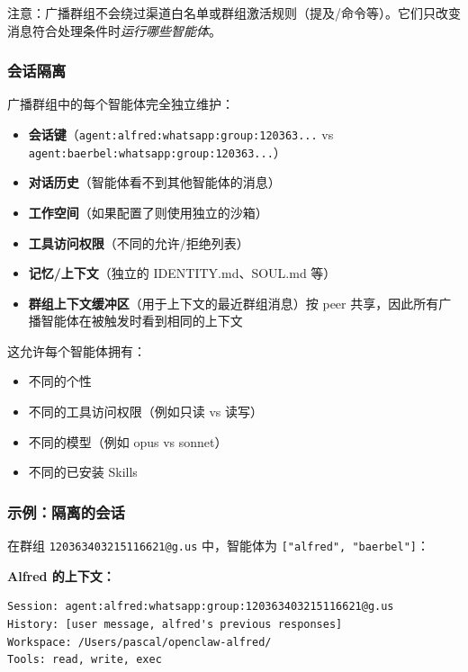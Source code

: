 注意：广播群组不会绕过渠道白名单或群组激活规则（提及/命令等）。它们只改变消息符合处理条件时\textit{运行哪些智能体}。

\subsubsection{会话隔离}


广播群组中的每个智能体完全独立维护：

\begin{itemize}
  \item \textbf{会话键}（\texttt{agent:alfred:whatsapp:group:120363...} vs \texttt{agent:baerbel:whatsapp:group:120363...}）
  \item \textbf{对话历史}（智能体看不到其他智能体的消息）
  \item \textbf{工作空间}（如果配置了则使用独立的沙箱）
  \item \textbf{工具访问权限}（不同的允许/拒绝列表）
  \item \textbf{记忆/上下文}（独立的 IDENTITY.md、SOUL.md 等）
  \item \textbf{群组上下文缓冲区}（用于上下文的最近群组消息）按 peer 共享，因此所有广播智能体在被触发时看到相同的上下文
\end{itemize}


这允许每个智能体拥有：

\begin{itemize}
  \item 不同的个性
  \item 不同的工具访问权限（例如只读 vs 读写）
  \item 不同的模型（例如 opus vs sonnet）
  \item 不同的已安装 Skills
\end{itemize}


\subsubsection{示例：隔离的会话}


在群组 \texttt{120363403215116621@g.us} 中，智能体为 \texttt{["alfred", "baerbel"]}：

\textbf{Alfred 的上下文：}

\begin{lstlisting}
Session: agent:alfred:whatsapp:group:120363403215116621@g.us
History: [user message, alfred's previous responses]
Workspace: /Users/pascal/openclaw-alfred/
Tools: read, write, exec
\end{lstlisting}



